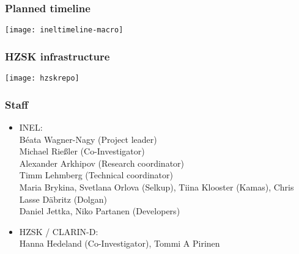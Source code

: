\documentclass{beamer}
\begin{document}
\begin{frame}
    \frametitle{Planned timeline}
    \texttt{[image: ineltimeline-macro]}
\end{frame}

\begin{frame}
    \frametitle{HZSK infrastructure}
    \texttt{[image: hzskrepo]}

\end{frame}


\begin{frame}
    \frametitle{Staff}
    \begin{itemize}
        \item INEL: \\
            Béata Wagner-Nagy (Project leader)\\
            Michael Rießler (Co-Investigator)\\
            Alexander Arkhipov (Research coordinator)\\
            Timm Lehmberg (Technical coordinator)\\
            Maria Brykina, Svetlana Orlova (Selkup),
            Tiina Klooster (Kamas), Chris Lasse Däbritz (Dolgan)
            \\
            Daniel Jettka, Niko Partanen (Developers)
        \item HZSK / CLARIN-D: \\
            Hanna Hedeland (Co-Investigator), Tommi A Pirinen
    \end{itemize}
\end{frame}
\end{document}
